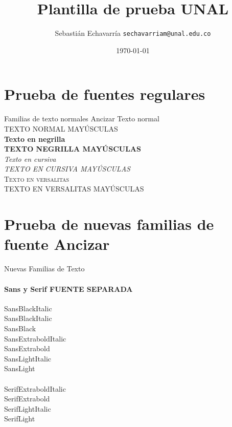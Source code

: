 \documentclass[]{beamer} %
\title{Plantilla de prueba UNAL}
\date[ISPN ’80]{\today}
\author[Sebasti\'an Echavarr\'ia ]{Sebasti\'an Echavarr\'ia \texttt{sechavarriam@unal.edu.co}}
\begin{document}
	
	\begin{frame}\end{frame} %
	
	
	\begin{frame} %
		\titlepage
	\end{frame}

\begin{frame} 
	\tableofcontents[pausesections]
\end{frame}


\section{Prueba de fuentes regulares}

\begin{frame}{Familias de texto normales Ancizar}
	Texto normal\\
	TEXTO NORMAL MAYÚSCULAS\\
	\textbf{Texto en negrilla}\\
	\textbf{TEXTO NEGRILLA MAYÚSCULAS}\\
	\textit{Texto en cursiva}\\
	\textit{TEXTO EN CURSIVA MAYÚSCULAS}\\
	\textsc{Texto en versalitas}\\
	\textsc{TEXTO EN VERSALITAS MAYÚSCULAS}
	
\end{frame}

\section{Prueba de nuevas familias de fuente Ancizar}
\begin{frame}{Nuevas Familias de Texto}
	\framesubtitle{Sans y Serif FUENTE SEPARADA}
	
	
	{\SansBlackItalic     SansBlackItalic    } \\
	{\SansBlackItalic     SansBlackItalic    } \\
	{\SansBlack           SansBlack          } \\
	{\SansExtraboldItalic SansExtraboldItalic} \\
	{\SansExtrabold       SansExtrabold      } \\
	{\SansLightItalic     SansLightItalic    } \\
	{\SansLight           SansLight          } \\~\\
 	
 	{\SerifExtraboldItalic SerifExtraboldItalic} \\
 	{\SerifExtrabold       SerifExtrabold      } \\
 	{\SerifLightItalic     SerifLightItalic    } \\
 	{\SerifLight           SerifLight          } \\
 	
	
\end{frame}
\end{document}
